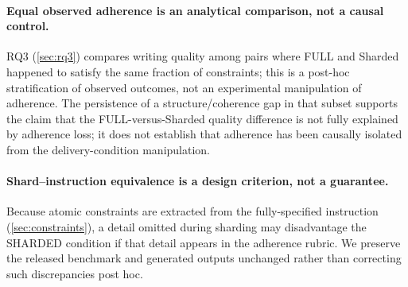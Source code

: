 \paragraph{Equal observed adherence is an analytical comparison, not a causal control.} RQ3 (\cref{sec:rq3}) compares writing quality among pairs where FULL and Sharded happened to satisfy the same fraction of constraints; this is a post-hoc stratification of observed outcomes, not an experimental manipulation of adherence. The persistence of a structure/coherence gap in that subset supports the claim that the FULL-versus-Sharded quality difference is not fully explained by adherence loss; it does not establish that adherence has been causally isolated from the delivery-condition manipulation.

\paragraph{Shard--instruction equivalence is a design criterion, not a guarantee.} Because atomic constraints are extracted from the fully-specified instruction (\cref{sec:constraints}), a detail omitted during sharding may disadvantage the SHARDED condition if that detail appears in the adherence rubric. We preserve the released benchmark and generated outputs unchanged rather than correcting such discrepancies post hoc.
